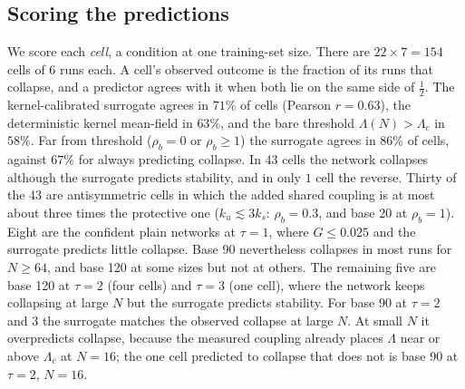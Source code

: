\subsection{Scoring the predictions}
We score each \emph{cell}, a condition at one training-set size. There are $22\times7=154$ cells of 6 runs each. A cell's observed outcome is the fraction of its runs that collapse, and a predictor agrees with it when both lie on the same side of $\tfrac12$.
The kernel-calibrated surrogate agrees in $71\%$ of cells (Pearson $r=0.63$), the deterministic kernel mean-field in $63\%$, and the bare threshold $\Lambda(N)>\Lambda_c$ in $58\%$. Far from threshold ($\rho_b=0$ or $\rho_b\ge1$) the surrogate agrees in $86\%$ of cells, against $67\%$ for always predicting collapse.
In $43$ cells the network collapses although the surrogate predicts stability, and in only $1$ cell the reverse.
Thirty of the 43 are antisymmetric cells in which the added shared coupling is at most about three times the protective one ($k_u\lesssim3k_s$: $\rho_b=0.3$, and base 20 at $\rho_b=1$).
Eight are the confident plain networks at $\tau=1$, where $G\le0.025$ and the surrogate predicts little collapse. Base 90 nevertheless collapses in most runs for $N\ge64$, and base 120 at some sizes but not at others.
The remaining five are base 120 at $\tau=2$ (four cells) and $\tau=3$ (one cell), where the network keeps collapsing at large $N$ but the surrogate predicts stability.
For base 90 at $\tau=2$ and $3$ the surrogate matches the observed collapse at large $N$. At small $N$ it overpredicts collapse, because the measured coupling already places $\Lambda$ near or above $\Lambda_c$ at $N=16$; the one cell predicted to collapse that does not is base 90 at $\tau=2$, $N=16$.

